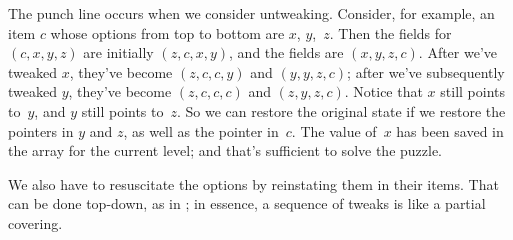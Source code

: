 The punch line occurs when we consider untweaking. Consider, for
example, an item $c$ whose options from top to bottom are $x$, $y$,~$z$.
Then the  fields for $(c,x,y,z)$ are initially $(z,c,x,y)$, and the
 fields are $(x,y,z,c)$. After we've tweaked $x$, they've become
$(z,c,c,y)$ and $(y,y,z,c)$; after we've subsequently tweaked $y$, they've
become $(z,c,c,c)$ and $(z,y,z,c)$. Notice that $x$ still points to~$y$,
and $y$ still points to~$z$. So we can restore the original state
if we restore the  pointers in $y$ and $z$, as well as the 
pointer in~$c$. The value of~$x$ has been saved in the 
array for the current level; and that's sufficient to solve the puzzle.

We also have to resuscitate the options by reinstating them in their items.
That can be done top-down, as in ; in essence, a sequence of
tweaks is like a partial covering.

